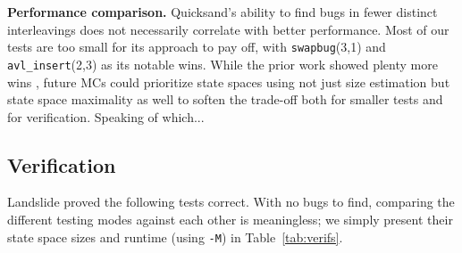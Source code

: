 \documentclass[10pt]{sigplanconf}
\begin{document}
		{\bf Performance comparison.}
		Quicksand's ability to find bugs in fewer distinct interleavings %
		does not necessarily correlate with better performance. %
		Most of our tests are too small for its approach to pay off,
		with {\tt swapbug}(3,1) and {\tt avl\_insert}(2,3) as its notable wins.
		While the prior work showed plenty more wins \cite{quicksand},
		future MCs could prioritize state spaces using not just size estimation
		but state space maximality as well
		to soften the trade-off
		both for smaller tests and for verification.
Speaking of which...

\subsection{Verification}

Landslide proved the following tests correct.
With no bugs to find, comparing the different testing modes against each other is meaningless;
we simply present their state space sizes and runtime (using {\tt -M}) in Table~\ref{tab:verifs}.
\end{document}
